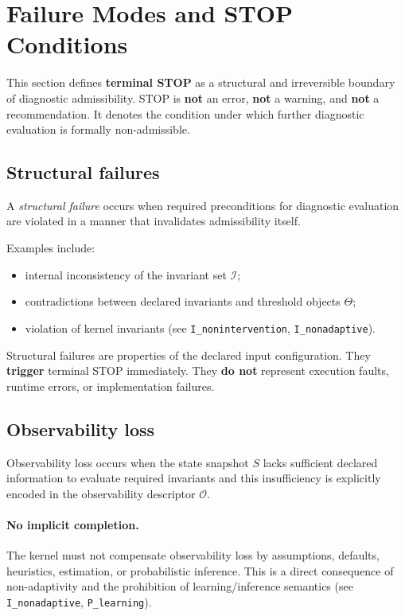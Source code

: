 ﻿\section{Failure Modes and STOP Conditions}
\label{sec:stop}

This section defines \textbf{terminal STOP} as a structural and irreversible
boundary of diagnostic admissibility.
STOP is \textbf{not} an error, \textbf{not} a warning, and \textbf{not} a
recommendation.
It denotes the condition under which further diagnostic evaluation is
formally non-admissible.

\subsection{Structural failures}

A \emph{structural failure} occurs when required preconditions for diagnostic
evaluation are violated in a manner that invalidates admissibility itself.

Examples include:
\begin{itemize}
  \item internal inconsistency of the invariant set $\mathcal{I}$;
  \item contradictions between declared invariants and threshold objects $\Theta$;
  \item violation of kernel invariants
        (see \texttt{I\_nonintervention}, \texttt{I\_nonadaptive}).
\end{itemize}

Structural failures are properties of the declared input configuration.
They \textbf{trigger} terminal STOP immediately.
They \textbf{do not} represent execution faults, runtime errors,
or implementation failures.

\subsection{Observability loss}

Observability loss occurs when the state snapshot $S$ lacks sufficient declared
information to evaluate required invariants and this insufficiency is
explicitly encoded in the observability descriptor $\mathcal{O}$.

\paragraph{No implicit completion.}
The kernel must not compensate observability loss by assumptions,
defaults, heuristics, estimation, or probabilistic inference.
This is a direct consequence of non-adaptivity and the prohibition of
learning/inference semantics (see \texttt{I\_nonadaptive}, \texttt{P\_learning}).

